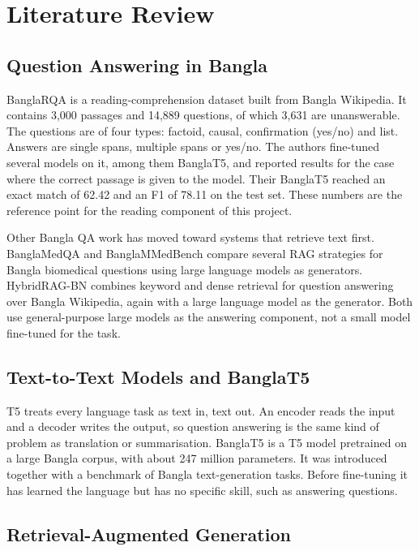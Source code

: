 \chapter{Literature Review}

\section{Question Answering in Bangla}

BanglaRQA \cite{ekram2022banglarqa} is a reading-comprehension dataset built from Bangla Wikipedia. It contains 3,000 passages and 14,889 questions, of which 3,631 are unanswerable. The questions are of four types: factoid, causal, confirmation (yes/no) and list. Answers are single spans, multiple spans or yes/no. The authors fine-tuned several models on it, among them BanglaT5, and reported results for the case where the correct passage is given to the model. Their BanglaT5 reached an exact match of 62.42 and an F1 of 78.11 on the test set. These numbers are the reference point for the reading component of this project.

Other Bangla QA work has moved toward systems that retrieve text first. BanglaMedQA and BanglaMMedBench \cite{sultana2025banglamedqa} compare several RAG strategies for Bangla biomedical questions using large language models as generators. HybridRAG-BN \cite{aich2026hybridragbn} combines keyword and dense retrieval for question answering over Bangla Wikipedia, again with a large language model as the generator. Both use general-purpose large models as the answering component, not a small model fine-tuned for the task.

\section{Text-to-Text Models and BanglaT5}

T5 \cite{raffel2020t5} treats every language task as text in, text out. An encoder reads the input and a decoder writes the output, so question answering is the same kind of problem as translation or summarisation. BanglaT5 \cite{bhattacharjee2023banglat5} is a T5 model pretrained on a large Bangla corpus, with about 247 million parameters. It was introduced together with a benchmark of Bangla text-generation tasks. Before fine-tuning it has learned the language but has no specific skill, such as answering questions.

\section{Retrieval-Augmented Generation}

